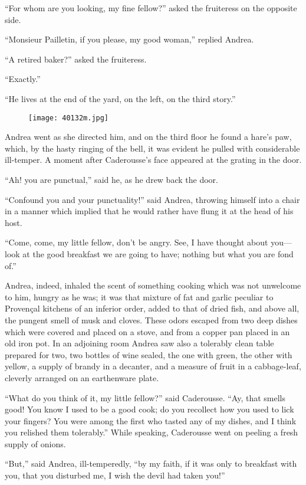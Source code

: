 “For whom are you looking, my fine fellow?” asked the fruiteress on the
opposite side.

“Monsieur Pailletin, if you please, my good woman,” replied Andrea.

“A retired baker?” asked the fruiteress.

“Exactly.”

“He lives at the end of the yard, on the left, on the third story.”

\begin{figure}[ht]
\texttt{[image: 40132m.jpg]}
\end{figure}

Andrea went as she directed him, and on the third floor he found a
hare’s paw, which, by the hasty ringing of the bell, it was evident he
pulled with considerable ill-temper. A moment after Caderousse’s face
appeared at the grating in the door.

“Ah! you are punctual,” said he, as he drew back the door.

“Confound you and your punctuality!” said Andrea, throwing himself into
a chair in a manner which implied that he would rather have flung it at
the head of his host.

“Come, come, my little fellow, don’t be angry. See, I have thought
about you—look at the good breakfast we are going to have; nothing but
what you are fond of.”

Andrea, indeed, inhaled the scent of something cooking which was not
unwelcome to him, hungry as he was; it was that mixture of fat and
garlic peculiar to Provençal kitchens of an inferior order, added to
that of dried fish, and above all, the pungent smell of musk and
cloves. These odors escaped from two deep dishes which were covered and
placed on a stove, and from a copper pan placed in an old iron pot. In
an adjoining room Andrea saw also a tolerably clean table prepared for
two, two bottles of wine sealed, the one with green, the other with
yellow, a supply of brandy in a decanter, and a measure of fruit in a
cabbage-leaf, cleverly arranged on an earthenware plate.

“What do you think of it, my little fellow?” said Caderousse. “Ay, that
smells good! You know I used to be a good cook; do you recollect how
you used to lick your fingers? You were among the first who tasted any
of my dishes, and I think you relished them tolerably.” While speaking,
Caderousse went on peeling a fresh supply of onions.

“But,” said Andrea, ill-temperedly, “by my faith, if it was only to
breakfast with you, that you disturbed me, I wish the devil had taken
you!”

